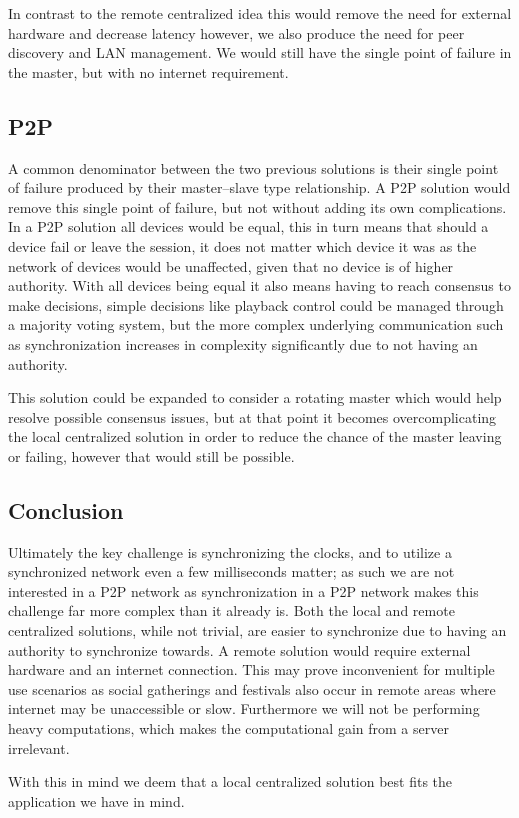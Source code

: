 In contrast to the remote centralized idea this would remove the need for external hardware and decrease latency however, we also produce the need for peer discovery and LAN management.
We would still have the single point of failure in the master, but with no internet requirement.

\subsection{\acl{P2P}}
A common denominator between the two previous solutions is their single point of failure produced by their master--slave type relationship.
A \ac{P2P} solution would remove this single point of failure, but not without adding its own complications.
In a \ac{P2P} solution all devices would be equal, this in turn means that should a device fail or leave the session, it does not matter which device it was as the network of devices would be unaffected, given that no device is of higher authority.
With all devices being equal it also means having to reach consensus to make decisions, simple decisions like playback control could be managed through a majority voting system, but the more complex underlying communication such as synchronization increases in complexity significantly due to not having an authority.

This solution could be expanded to consider a rotating master which would help resolve possible consensus issues, but at that point it becomes overcomplicating the local centralized solution in order to reduce the chance of the master leaving or failing, however that would still be possible.

\subsection{Conclusion}
Ultimately the key challenge is synchronizing the clocks, and to utilize a synchronized network even a few milliseconds matter; as such we are not interested in a \ac{P2P} network as synchronization in a \ac{P2P} network makes this challenge far more complex than it already is.
Both the local and remote centralized solutions, while not trivial, are easier to synchronize due to having an authority to synchronize towards.
A remote solution would require external hardware and an internet connection.
This may prove inconvenient for multiple use scenarios as social gatherings and festivals also occur in remote areas where internet may be unaccessible or slow.
Furthermore we will not be performing heavy computations, which makes the computational gain from a server irrelevant.

With this in mind we deem that a local centralized solution best fits the application we have in mind.
